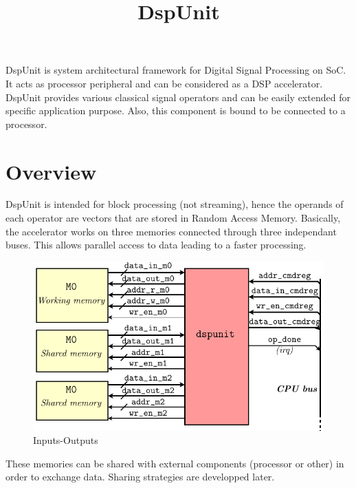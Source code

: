 \documentclass[11pt]{article}
\title{
DspUnit\\
}
\author{}
\date{}%
\begin{document}
\maketitle



DspUnit is system architectural framework for Digital Signal Processing on SoC. It acts as processor peripheral and can be considered as a DSP accelerator. DspUnit provides various classical signal operators and can be easily extended for specific application purpose. Also, this component is bound to be connected to a processor.

\section{Overview}

DspUnit is intended for block processing (not streaming), hence the operands of each operator are vectors that are stored in Random Access Memory. Basically, the accelerator works on three memories connected through three independant buses. This allows parallel access to data leading to a faster processing.
\begin{figure}
 \centering
 \includegraphics{img/dspunit_inout.pdf}
 \caption{Inputs-Outputs}
\end{figure}
These memories can be shared with external components (processor or other) in order to exchange data. Sharing strategies are developped later.
\end{document}
